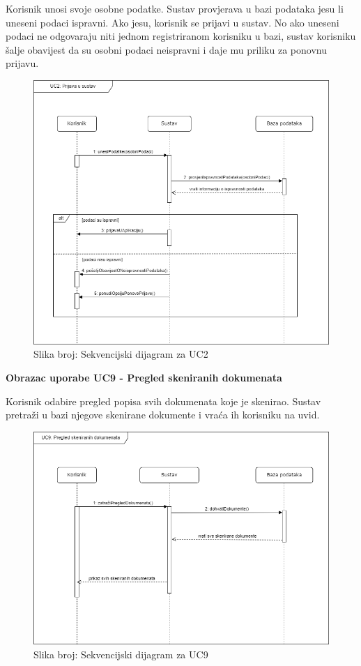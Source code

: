 				Korisnik unosi svoje osobne podatke. Sustav provjerava u bazi podataka jesu li uneseni podaci ispravni. Ako jesu, korisnik se prijavi u sustav. No ako uneseni podaci ne odgovaraju niti jednom registriranom korisniku u bazi, sustav korisniku šalje obavijest da su osobni podaci neispravni i daje mu priliku za ponovnu prijavu.
				\begin{figure}[H]
					\includegraphics[width=\textwidth]{slike/sekvencijski_dijagram_UC2.PNG} %
					\caption{Slika broj: Sekvencijski dijagram za UC2}
					\label{fig:UC2} %
				\end{figure}
				\clearpage

				\textbf{Obrazac uporabe UC9 - Pregled skeniranih dokumenata}\
				
				Korisnik odabire pregled popisa svih dokumenata koje je skenirao. Sustav pretraži u bazi njegove skenirane dokumente i vraća ih korisniku na uvid.
				\begin{figure}[H]
					\includegraphics[width=\textwidth]{slike/sekvencijski_dijagram_UC9.PNG} %
					\caption{Slika broj: Sekvencijski dijagram za UC9}
					\label{fig:UC9} %
				\end{figure}
				\clearpage

